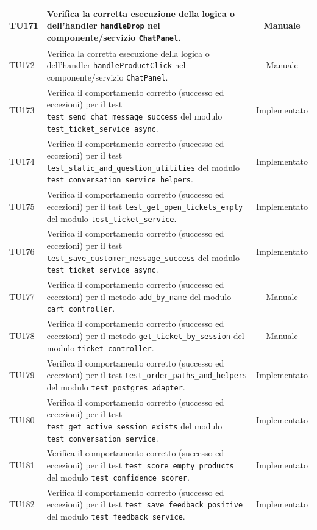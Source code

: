 \documentclass[a4paper,11pt,oneside]{scrartcl}
\begin{document}
\begin{longtable}{|p{1.9cm}|p{11.6cm}|c|}
    TU171 & Verifica la corretta esecuzione della logica o dell'handler \texttt{handleDrop} nel componente/servizio \texttt{ChatPanel}. & Manuale \\ \hline
    TU172 & Verifica la corretta esecuzione della logica o dell'handler \texttt{handleProductClick} nel componente/servizio \texttt{ChatPanel}. & Manuale \\ \hline
    TU173 & Verifica il comportamento corretto (successo ed eccezioni) per il test \texttt{test\_send\_chat\_message\_success} del modulo \texttt{test\_ticket\_service     async}. & Implementato \\ \hline
    TU174 & Verifica il comportamento corretto (successo ed eccezioni) per il test \texttt{test\_static\_and\_question\_utilities} del modulo \texttt{test\_conversation\_service\_helpers}. & Implementato \\ \hline
    TU175 & Verifica il comportamento corretto (successo ed eccezioni) per il test \texttt{test\_get\_open\_tickets\_empty} del modulo \texttt{test\_ticket\_service}. & Implementato \\ \hline
    TU176 & Verifica il comportamento corretto (successo ed eccezioni) per il test \texttt{test\_save\_customer\_message\_success} del modulo \texttt{test\_ticket\_service     async}. & Implementato \\ \hline
    TU177 & Verifica il comportamento corretto (successo ed eccezioni) per il metodo \texttt{add\_by\_name} del modulo \texttt{cart\_controller}. & Manuale \\ \hline
    TU178 & Verifica il comportamento corretto (successo ed eccezioni) per il metodo \texttt{get\_ticket\_by\_session} del modulo \texttt{ticket\_controller}. & Manuale \\ \hline
    TU179 & Verifica il comportamento corretto (successo ed eccezioni) per il test \texttt{test\_order\_paths\_and\_helpers} del modulo \texttt{test\_postgres\_adapter}. & Implementato \\ \hline
    TU180 & Verifica il comportamento corretto (successo ed eccezioni) per il test \texttt{test\_get\_active\_session\_exists} del modulo \texttt{test\_conversation\_service}. & Implementato \\ \hline
    TU181 & Verifica il comportamento corretto (successo ed eccezioni) per il test \texttt{test\_score\_empty\_products} del modulo \texttt{test\_confidence\_scorer}. & Implementato \\ \hline
    TU182 & Verifica il comportamento corretto (successo ed eccezioni) per il test \texttt{test\_save\_feedback\_positive} del modulo \texttt{test\_feedback\_service}. & Implementato \\ \hline

\end{longtable}
\end{document}
